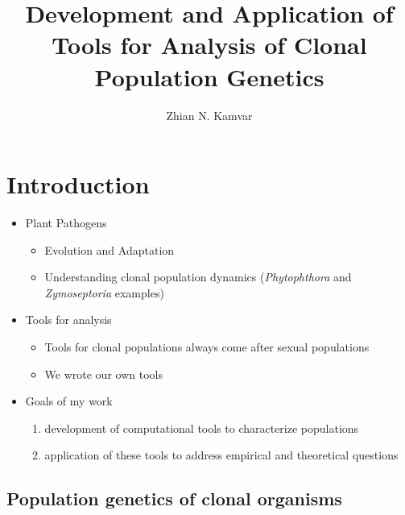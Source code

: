 \documentclass[double,12pt]{beavtex}
\title{Development and Application of Tools for Analysis of Clonal Population
Genetics} %
\author{Zhian N. Kamvar} %
\providecommand{\tightlist}{%
  \setlength{\itemsep}{0pt}\setlength{\parskip}{0pt}}
\begin{document}
\maketitle
\mainmatter


  \chapter{Introduction}\label{introduction}
  
  \begin{itemize}
  \tightlist
  \item
    Plant Pathogens
  
    \begin{itemize}
    \tightlist
    \item
      Evolution and Adaptation
    \item
      Understanding clonal population dynamics (\emph{Phytophthora} and
      \emph{Zymoseptoria} examples)
    \end{itemize}
  \item
    Tools for analysis
  
    \begin{itemize}
    \tightlist
    \item
      Tools for clonal populations always come after sexual populations
    \item
      We wrote our own tools
    \end{itemize}
  \item
    Goals of my work
  
    \begin{enumerate}
    \def\labelenumi{\arabic{enumi}.}
    \tightlist
    \item
      development of computational tools to characterize populations
    \item
      application of these tools to address empirical and theoretical
      questions
    \end{enumerate}
  \end{itemize}
  
  \section{Population genetics of clonal
  organisms}\label{population-genetics-of-clonal-organisms}
  
\end{document}
